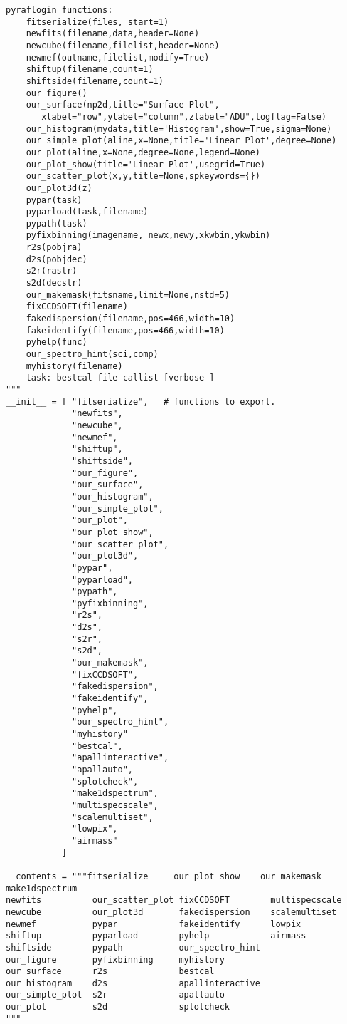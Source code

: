 {\begin{verbatim}
pyraflogin functions:
    fitserialize(files, start=1)
    newfits(filename,data,header=None)
    newcube(filename,filelist,header=None)
    newmef(outname,filelist,modify=True)
    shiftup(filename,count=1)
    shiftside(filename,count=1)
    our_figure()
    our_surface(np2d,title="Surface Plot",
       xlabel="row",ylabel="column",zlabel="ADU",logflag=False)
    our_histogram(mydata,title='Histogram',show=True,sigma=None)
    our_simple_plot(aline,x=None,title='Linear Plot',degree=None)
    our_plot(aline,x=None,degree=None,legend=None)
    our_plot_show(title='Linear Plot',usegrid=True)
    our_scatter_plot(x,y,title=None,spkeywords={})
    our_plot3d(z)
    pypar(task)
    pyparload(task,filename)
    pypath(task)
    pyfixbinning(imagename, newx,newy,xkwbin,ykwbin)
    r2s(pobjra)
    d2s(pobjdec)
    s2r(rastr)
    s2d(decstr)
    our_makemask(fitsname,limit=None,nstd=5)
    fixCCDSOFT(filename)
    fakedispersion(filename,pos=466,width=10)
    fakeidentify(filename,pos=466,width=10)
    pyhelp(func)
    our_spectro_hint(sci,comp)
    myhistory(filename)
    task: bestcal file callist [verbose-]
"""
__init__ = [ "fitserialize",   # functions to export.
             "newfits",
             "newcube",
             "newmef",
             "shiftup",
             "shiftside",
             "our_figure",
             "our_surface",
             "our_histogram",
             "our_simple_plot",
             "our_plot",
             "our_plot_show",
             "our_scatter_plot",
             "our_plot3d",
             "pypar",
             "pyparload",
             "pypath",
             "pyfixbinning",
             "r2s",
             "d2s",
             "s2r",
             "s2d",
             "our_makemask",
             "fixCCDSOFT",
             "fakedispersion",
             "fakeidentify",
             "pyhelp",
             "our_spectro_hint",
             "myhistory"
             "bestcal",
             "apallinteractive",
             "apallauto",
             "splotcheck",
             "make1dspectrum",
             "multispecscale",
             "scalemultiset",
             "lowpix",
             "airmass"
           ]

__contents = """fitserialize     our_plot_show    our_makemask      make1dspectrum
newfits          our_scatter_plot fixCCDSOFT        multispecscale
newcube          our_plot3d       fakedispersion    scalemultiset
newmef           pypar            fakeidentify      lowpix
shiftup          pyparload        pyhelp            airmass
shiftside        pypath           our_spectro_hint
our_figure       pyfixbinning     myhistory
our_surface      r2s              bestcal
our_histogram    d2s              apallinteractive
our_simple_plot  s2r              apallauto
our_plot         s2d              splotcheck
"""


\end{verbatim}}
